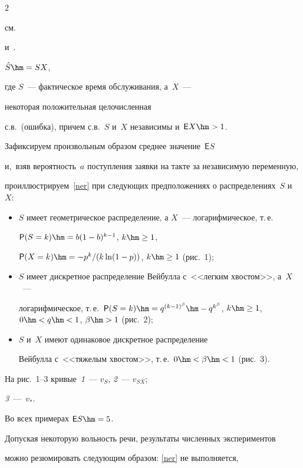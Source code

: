 \begin{multicols}{2}
{см.~\cite[Secion 6.3]{Mat}

и~\cite{LusMilR}.} $\hat S\hm=SX$,

где $S$~--- фактическое время обслуживания, а~$X$~--- 

некоторая положительная целочисленная

с.в.\ (ошибка), причем с.в.~$S$ и~$X$ независимы и~$\mathsf{E}X\hm>1$.



Зафиксируем произвольным образом среднее значение~$\mathsf{E}S$ 

и,~взяв вероятность~$a$ поступления заявки на такте за независимую переменную,

проиллюстрируем~\eqref{ner} при следующих предположениях о распределениях~$S$ и~$X$:

\begin{itemize}

\item[---] $S$ имеет геометрическое распределение, а $X$~--- логарифмическое, т.\,е.\

$\mathsf{P}(S=k)\hm=b(1-b)^{k-1}$, $k\hm\ge 1$,

$\mathsf{P}(X=k)\hm=-p^k/(k\ln(1-p))$, $k\hm \ge 1$ (рис.~1);

\item[---] $S$ имеет дискретное распределение Вейбулла с~<<легким хвостом>>, а~$X$~--- 

логарифмическое, т.\,е.\ $\mathsf{P}(S=k)\hm=q^{(k-1)^{\beta}}

\hm-q^{k^{\beta}}$, $k\hm\ge 1$, $0\hm<q\hm<1$, $\beta\hm>1$ (рис.~2);

\item[---] $S$ и~$X$ имеют одинаковое дискретное распределение 

Вейбулла с~<<тяжелым хвостом>>, т.\,е.\ $0\hm<\beta\hm<1$ (рис.~3).

\end{itemize}



На рис.~1--3 кривые~\textit{1}~--- $v_{S}$, \textit{2}~--- $v_{SX}$; 

\textit{3}~---~$v_*$.

Во всех примерах $\mathsf{E}S\hm=5$.









Допуская некоторую вольность речи, результаты численных экспериментов

можно резюмировать следующим образом: \eqref{ner} не выполняется, 


\end{multicols}
